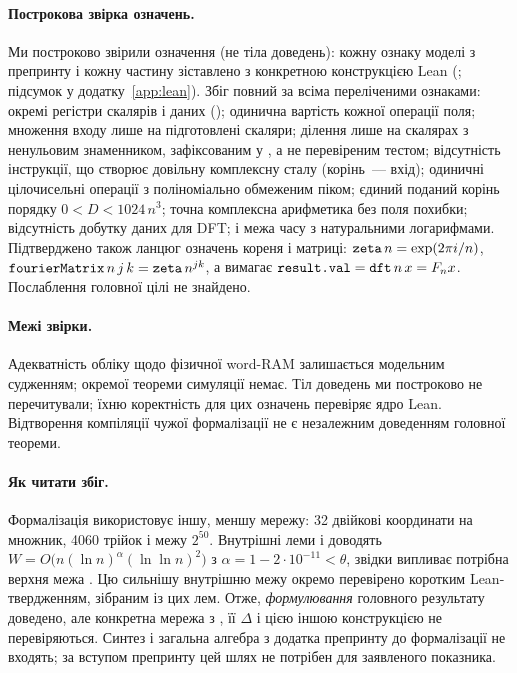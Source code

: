 \documentclass[11pt]{article}
\theoremstyle{plain}
\begin{document}
\paragraph{Построкова звірка означень.}
Ми построково звірили означення (не тіла доведень): кожну ознаку моделі з  препринту і кожну частину  зіставлено з конкретною конструкцією Lean (; підсумок у додатку~\ref{app:lean}). Збіг повний за всіма переліченими ознаками: окремі регістри скалярів і даних (); одинична вартість кожної операції поля; множення входу лише на підготовлені скаляри; ділення лише на скалярах з ненульовим знаменником, зафіксованим у , а не перевіреним тестом; відсутність інструкції, що створює довільну комплексну сталу (корінь~--- вхід); одиничні цілочисельні операції з поліноміально обмеженим піком; єдиний поданий корінь порядку $0<D<1024\,n^3$; точна комплексна арифметика без поля похибки; відсутність добутку даних для DFT; і межа часу  з натуральними логарифмами. Підтверджено також ланцюг означень кореня і матриці: $\texttt{zeta}\,n=\exp(2\pi i/n)$, $\texttt{fourierMatrix}\,n\,j\,k=\texttt{zeta}\,n^{jk}$, а  вимагає $\texttt{result.val}=\texttt{dft}\,n\,x=F_nx$. Послаблення головної цілі не знайдено.

\paragraph{Межі звірки.}
Адекватність обліку  щодо фізичної word-RAM залишається модельним судженням; окремої теореми симуляції немає. Тіл доведень ми построково не перечитували; їхню коректність для цих означень перевіряє ядро Lean. Відтворення компіляції чужої формалізації не є незалежним доведенням головної теореми.

\paragraph{Як читати збіг.}
Формалізація використовує іншу, меншу мережу: 32 двійкові координати на множник, 4060 трійок і межу $2^{50}$. Внутрішні леми  і  доводять $W=O\bigl(n(\ln n)^{\alpha}(\ln\ln n)^2\bigr)$ з $\alpha=1-2\cdot10^{-11}<\theta$, звідки випливає потрібна верхня межа . Цю сильнішу внутрішню межу окремо перевірено коротким Lean-твердженням, зібраним із цих лем. Отже, \emph{формулювання} головного результату доведено, але конкретна мережа з , її $\Delta$ і  цією іншою конструкцією не перевіряються. Синтез і загальна алгебра з додатка препринту до формалізації не входять; за вступом препринту цей шлях не потрібен для заявленого показника.
\end{document}
